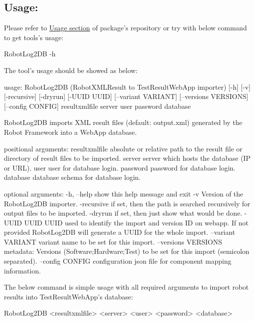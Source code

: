 \subsection{Usage:}
Please refer to \href{https://github.com/test-fullautomation/robotframework-robotlog2db#usage}{Usage section}
of package's repository or try with below command to get tools's usage:
\begin{robotlog}
RobotLog2DB -h
\end{robotlog}

The tool's usage should be showed as below:
\begin{robotlog}
usage: RobotLog2DB (RobotXMLResult to TestResultWebApp importer) [-h] [-v] 
                     [-recursive] [-dryrun] [-UUID UUID] [--variant VARIANT] 
                     [--versions VERSIONS] [--config CONFIG]
                     resultxmlfile server user password database

RobotLog2DB imports XML result files (default: output.xml) generated by the 
                     Robot Framework into a WebApp database.

positional arguments:
resultxmlfile        absolute or relative path to the result file or directory 
                     of result files to be imported.
server               server which hosts the database (IP or URL).
user                 user for database login.
password             password for database login.
database             database schema for database login.

optional arguments:
-h, --help           show this help message and exit
-v                   Version of the RobotLog2DB importer.
-recursive           if set, then the path is searched recursively for output 
                     files to be imported.
-dryrun              if set, then just show what would be done.
-UUID UUID           UUID used to identify the import and version ID on webapp. 
                     If not provided RobotLog2DB will generate a UUID for 
                     the whole import.
--variant VARIANT    variant name to be set for this import.
--versions VERSIONS  metadata: Versions (Software;Hardware;Test) to be set for 
                     this import (semicolon separated).
--config CONFIG      configuration json file for component mapping information.
\end{robotlog}

The below command is simple usage with all required arguments to import 
robot results into TestResultWebApp's database:
\begin{robotlog}
RobotLog2DB <resultxmlfile> <server> <user> <password> <database>
\end{robotlog}

